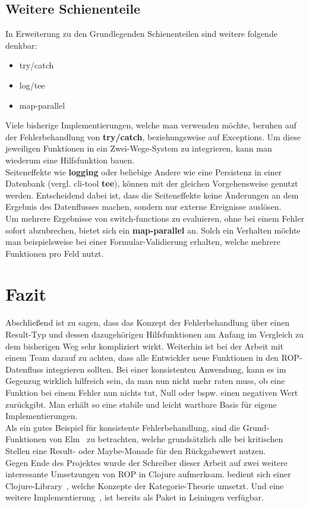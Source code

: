 \documentclass[10pt,journal,compsoc]{IEEEtran}
\begin{document}
  \subsection{Weitere Schienenteile}
  In Erweiterung zu den Grundlegenden Schienenteilen sind weitere folgende denkbar:
  \begin{itemize}
    \item try/catch
    \item log/tee
    \item map-parallel
  \end{itemize}
  Viele bisherige Implementierungen, welche man verwenden möchte, beruhen auf der Fehlerbehandlung von \textbf{try/catch}, beziehungsweise auf Exceptions.
  Um diese jeweiligen Funktionen in ein Zwei-Wege-System zu integrieren, kann man wiederum eine Hilfsfunktion bauen.\\
  Seiteneffekte wie \textbf{logging} oder beliebige Andere wie eine Persistenz in einer Datenbank (vergl. cli-tool \textbf{tee}), können mit der gleichen Vorgehensweise genutzt werden.
  Entscheidend dabei ist, dass die Seiteneffekte keine Änderungen an dem Ergebnis des Datenflusses machen, sondern nur externe Ereignisse auslösen.\\
  Um mehrere Ergebnisse von switch-functions zu evaluieren, ohne bei einem Fehler sofort abzubrechen, bietet sich ein \textbf{map-parallel} an.
  Solch ein Verhalten möchte man beispielsweise bei einer Formular-Validierung erhalten, welche mehrere Funktionen pro Feld nutzt.

  \section{Fazit}
  Abschließend ist zu sagen, dass das Konzept der Fehlerbehandlung über einen Result-Typ und dessen dazugehörigen Hilfsfunktionen am Anfang im Vergleich zu dem bisherigen Weg sehr kompliziert wirkt.
  Weiterhin ist bei der Arbeit mit einem Team darauf zu achten, dass alle Entwickler neue Funktionen in den ROP-Datenfluss integrieren sollten.
  Bei einer konsistenten Anwendung, kann es im Gegenzug wirklich hilfreich sein, da man nun nicht mehr raten muss, ob eine Funktion bei einem Fehler nun nichts tut, Null oder bspw. einen negativen Wert zurückgibt.
  Man erhält so eine stabile und leicht wartbare Basis für eigene Implementierungen.\\
  Als ein gutes Beispiel für konsistente Fehlerbehandlung, sind die Grund-Funktionen von Elm~\cite{elm} zu betrachten, welche grundsätzlich alle bei kritischen Stellen eine Result- oder Maybe-Monade für den Rückgabewert nutzen.\\
  Gegen Ende des Projektes wurde der Schreiber dieser Arbeit auf zwei weitere interessante Umsetzungen von ROP in Clojure aufmerksam. \cite{otherrop} bedient sich einer Clojure-Library~\cite{clojurecats}, welche Konzepte der Kategorie-Theorie umsetzt.
  Und eine weitere Implementierung~\cite{otherrop2}, ist bereits als Paket in Leiningen verfügbar.
\end{document}
